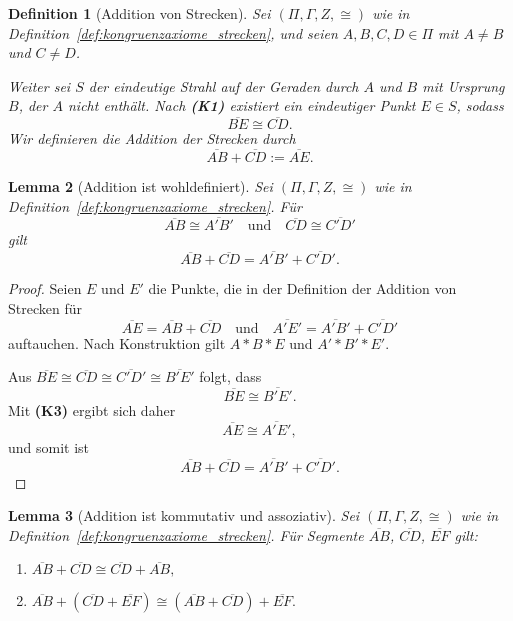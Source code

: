 \documentclass[a4paper,12pt]{article}
\theoremstyle{break}
\newtheorem{definition}{Definition}[section]
\newtheorem{lemma}[definition]{Lemma}
\begin{document}
\begin{definition}[Addition von Strecken]
Sei \((\Pi, \Gamma, Z, \cong)\) wie in Definition~\ref{def:kongruenzaxiome_strecken}, und seien \(A, B, C, D \in \Pi\) mit \(A \neq B\) und \(C \neq D\). 

Weiter sei \(S\) der eindeutige Strahl auf der Geraden durch \(A\) und \(B\) mit Ursprung \(B\), der \(A\) nicht enthält. Nach \textbf{(K1)} existiert ein eindeutiger Punkt \(E \in S\), sodass 
\[
\overline{BE} \cong \overline{CD}.
\]
Wir definieren die Addition der Strecken durch 
\[
\overline{AB} + \overline{CD} := \overline{AE}.
\]
\end{definition}

\begin{lemma}[Addition ist wohldefiniert]
Sei \((\Pi, \Gamma, Z, \cong)\) wie in Definition~\ref{def:kongruenzaxiome_strecken}. Für 
\[
\overline{AB} \cong \overline{A'B'} \quad \text{und} \quad \overline{CD} \cong \overline{C'D'}
\]
gilt 
\[
\overline{AB} + \overline{CD} = \overline{A'B'} + \overline{C'D'}.
\]
\end{lemma}

\begin{proof}
Seien \(E\) und \(E'\) die Punkte, die in der Definition der Addition von Strecken für 
\[
\overline{AE} = \overline{AB} + \overline{CD} \quad \text{und} \quad \overline{A'E'} = \overline{A'B'} + \overline{C'D'}
\]
auftauchen. Nach Konstruktion gilt \(A * B * E\) und \(A' * B' * E'\). 

Aus \(\overline{BE} \cong \overline{CD} \cong \overline{C'D'} \cong \overline{B'E'}\) folgt, dass 
\[
\overline{BE} \cong \overline{B'E'}.
\]
Mit \textbf{(K3)} ergibt sich daher 
\[
\overline{AE} \cong \overline{A'E'},
\]
und somit ist 
\[
\overline{AB} + \overline{CD} = \overline{A'B'} + \overline{C'D'}.
\]
\end{proof}

\begin{lemma}[Addition ist kommutativ und assoziativ]
Sei \((\Pi, \Gamma, Z, \cong)\) wie in Definition~\ref{def:kongruenzaxiome_strecken}. Für Segmente \(\overline{AB}\), \(\overline{CD}\), \(\overline{EF}\) gilt:
\begin{enumerate}
    \item \(\overline{AB} + \overline{CD} \cong \overline{CD} + \overline{AB},\)
    \item \(\overline{AB} + (\overline{CD} + \overline{EF}) \cong (\overline{AB} + \overline{CD}) + \overline{EF}.\)
\end{enumerate}
\end{lemma}
\end{document}
